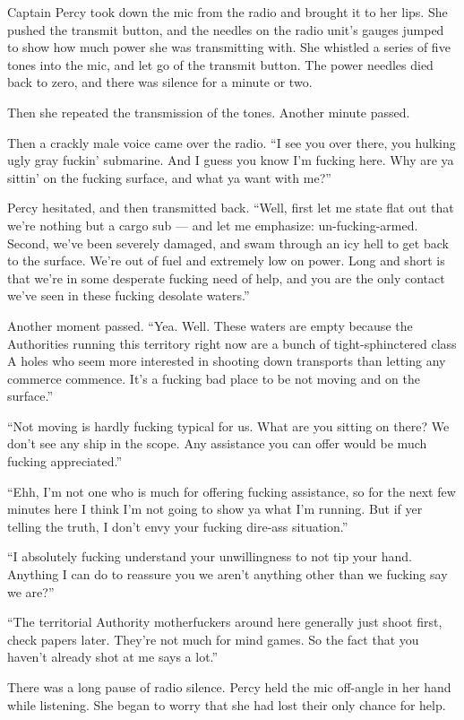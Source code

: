 \documentclass[]{scrbook}
\begin{document}
Captain Percy took down the mic from the radio and brought it to her
lips. She pushed the transmit button, and the needles on the radio
unit's gauges jumped to show how much power she was transmitting with.
She whistled a series of five tones into the mic, and let go of the
transmit button. The power needles died back to zero, and there was
silence for a minute or two.

Then she repeated the transmission of the tones. Another minute passed.

Then a crackly male voice came over the radio. ``I see you over there,
you hulking ugly gray fuckin' submarine. And I guess you know I'm
fucking here. Why are ya sittin' on the fucking surface, and what ya
want with me?''

Percy hesitated, and then transmitted back. ``Well, first let me state
flat out that we're nothing but a cargo sub --- and let me emphasize:
un-fucking-armed. Second, we've been severely damaged, and swam through
an icy hell to get back to the surface. We're out of fuel and extremely
low on power. Long and short is that we're in some desperate fucking
need of help, and you are the only contact we've seen in these fucking
desolate waters.''

Another moment passed. ``Yea. Well. These waters are empty because the
Authorities running this territory right now are a bunch of
tight-sphinctered class A holes who seem more interested in shooting
down transports than letting any commerce commence. It's a fucking bad
place to be not moving and on the surface.''

``Not moving is hardly fucking typical for us. What are you sitting on
there? We don't see any ship in the scope. Any assistance you can offer
would be much fucking appreciated.''

``Ehh, I'm not one who is much for offering fucking assistance, so for
the next few minutes here I think I'm not going to show ya what I'm
running. But if yer telling the truth, I don't envy your fucking
dire-ass situation.''

``I absolutely fucking understand your unwillingness to not tip your
hand. Anything I can do to reassure you we aren't anything other than we
fucking say we are?''

``The territorial Authority motherfuckers around here generally just
shoot first, check papers later. They're not much for mind games. So the
fact that you haven't already shot at me says a lot.''

There was a long pause of radio silence. Percy held the mic off-angle in
her hand while listening. She began to worry that she had lost their
only chance for help.
\end{document}
